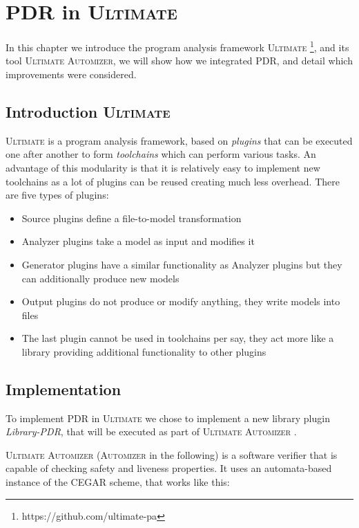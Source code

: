 \documentclass[11pt, a4paper, BCOR=10mm, ngerman]{scrbook}
\begin{document}
\pagebreak


\chapter{PDR in \textsc{Ultimate}}
In this chapter we introduce the program analysis framework \textsc{Ultimate} \footnote{https://github.com/ultimate-pa}, and its tool \textsc{Ultimate Automizer}, we will show how we integrated PDR, and detail which improvements were considered.
\section{Introduction \textsc{Ultimate}}
\textsc{Ultimate} is a program analysis framework, based on \textsl{plugins} that can be executed one after another to form \textsl{toolchains} which can perform various tasks. An advantage of this modularity is that it is relatively easy to implement new toolchains as a lot of plugins can be reused creating much less overhead. There are five types of plugins: 
\begin{itemize}
\item Source plugins define a file-to-model transformation

\item  Analyzer plugins take a model as input and modifies it

\item Generator plugins have a similar functionality as Analyzer plugins but they can additionally produce new models

\item Output plugins do not produce or modify anything, they write models into files

\item The last plugin cannot be used in toolchains per say, they act more like a library providing additional functionality to other plugins

\end{itemize}

\section{Implementation}
To implement PDR in \textsc{Ultimate} we chose to implement a new library plugin \textsl{Library-PDR}, that will be executed as part of \textsc{Ultimate Automizer} \cite{Heizmann:2013:SMC:2526861.2526864}. \par 
\textsc{Ultimate Automizer} (\textsc{Automizer} in the following) is a software verifier that is capable of checking safety and liveness properties. It uses an automata-based \cite{DBLP:conf/cav/HeizmannHP13} instance of the CEGAR scheme, that works like this: \\
\end{document}
